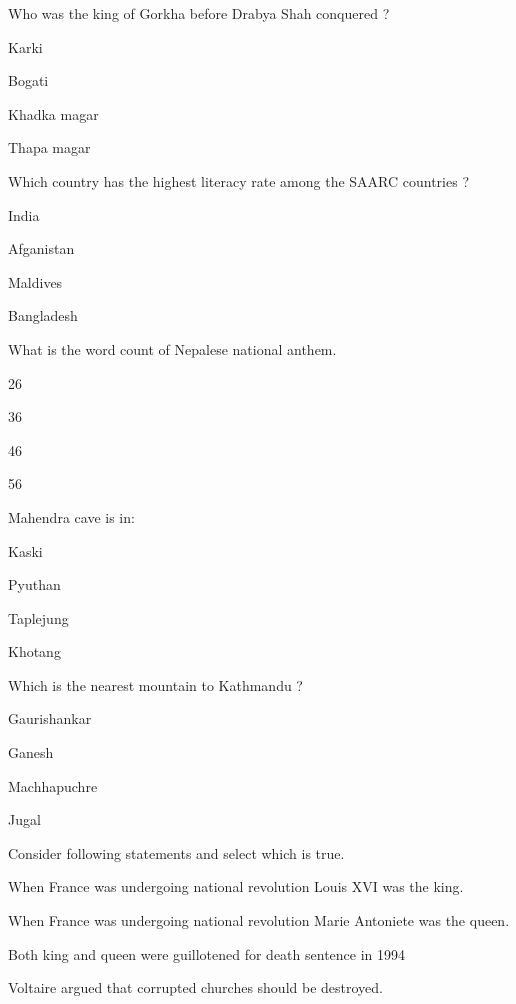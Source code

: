\begin{questions}
\question Who was the king of Gorkha before Drabya Shah conquered ?
  \begin{items}
  \item Karki
  \item Bogati
  \item Khadka magar
  \item Thapa magar
  \end{items}

\question Which country has the highest literacy rate among the SAARC countries ?
  \begin{items}
  \item India
  \item Afganistan
  \item Maldives
  \item Bangladesh
  \end{items}

\question What is the word count of Nepalese national anthem.
  \begin{items}
  \item 26
  \item 36
  \item 46
  \item 56
  \end{items}

\question Mahendra cave is in:
  \begin{items}
  \item Kaski
  \item Pyuthan
  \item Taplejung
  \item Khotang
  \end{items}

\question Which is the nearest mountain to Kathmandu ?
  \begin{items}
  \item Gaurishankar
  \item Ganesh
  \item Machhapuchre
  \item Jugal
  \end{items}

\question Consider following statements and select which is true.
  \begin{items}
  \item When France was undergoing national revolution Louis XVI was the king.
  \item When France was undergoing national revolution Marie Antoniete was the queen.
  \item Both king and queen were guillotened for death sentence in 1994
  \item Voltaire argued that corrupted churches should be destroyed.
  \end{items}


\end{questions}
